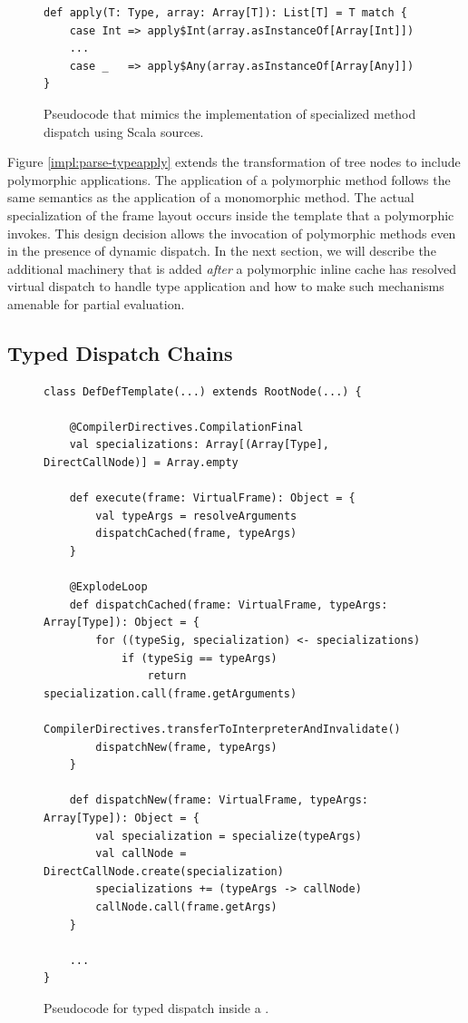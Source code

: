 \begin{figure}[!htb]
\begin{verbatim}
def apply(T: Type, array: Array[T]): List[T] = T match {
	case Int => apply$Int(array.asInstanceOf[Array[Int]])
	...
	case _   => apply$Any(array.asInstanceOf[Array[Any]])
}
\end{verbatim}
\caption{Pseudocode that mimics the implementation of specialized method dispatch using Scala sources.}
\end{figure}

Figure \ref{impl:parse-typeapply} extends the transformation of  tree nodes to include polymorphic applications.
The application of a polymorphic method follows the same semantics as the application of a monomorphic method.
The actual specialization of the frame layout occurs inside the template that a polymorphic  invokes.
This design decision allows the invocation of polymorphic methods even in the presence of dynamic dispatch.
In the next section, we will describe the additional machinery that is added \textit{after} a polymorphic inline cache has resolved virtual dispatch to handle type application and how to make such mechanisms amenable for partial evaluation.

\subsection{Typed Dispatch Chains}

\begin{figure}[!htb]
\begin{verbatim}
class DefDefTemplate(...) extends RootNode(...) { 
		
	@CompilerDirectives.CompilationFinal
	val specializations: Array[(Array[Type], DirectCallNode)] = Array.empty
		
	def execute(frame: VirtualFrame): Object = {
		val typeArgs = resolveArguments
		dispatchCached(frame, typeArgs)
	}
		
	@ExplodeLoop
	def dispatchCached(frame: VirtualFrame, typeArgs: Array[Type]): Object = {
		for ((typeSig, specialization) <- specializations)
			if (typeSig == typeArgs)
				return specialization.call(frame.getArguments)
		CompilerDirectives.transferToInterpreterAndInvalidate()
		dispatchNew(frame, typeArgs)
	}
	
	def dispatchNew(frame: VirtualFrame, typeArgs: Array[Type]): Object = {
		val specialization = specialize(typeArgs)
		val callNode = DirectCallNode.create(specialization)
		specializations += (typeArgs -> callNode)
		callNode.call(frame.getArgs)
	}
	
	...
}
\end{verbatim}
\caption{Pseudocode for typed dispatch inside a .}
\label{impl:defdeftemplate-execute}
\end{figure}

